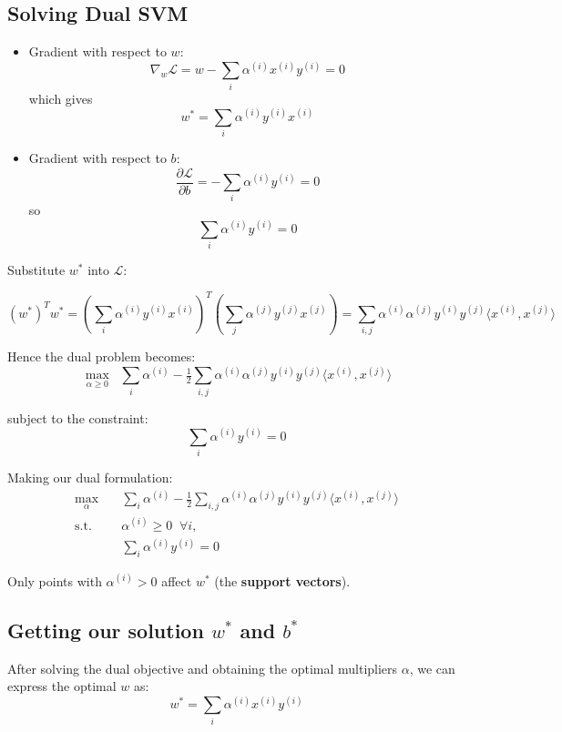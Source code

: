 \documentclass[11pt]{article}
\begin{document}
\subsection*{Solving Dual SVM}

\begin{itemize}
    \item Gradient with respect to $w$:
    \[
    \nabla_w \mathcal{L} = w - \sum_i \alpha^{(i)} x^{(i)} y^{(i)} = 0
    \]
    which gives
    \[
    w^* = \sum_i \alpha^{(i)} y^{(i)} x^{(i)}
    \]

    \item Gradient with respect to $b$:
    \[
    \frac{\partial \mathcal{L}}{\partial b} 
    = - \sum_i \alpha^{(i)} y^{(i)} = 0
    \]
    so
    \[
    \sum_i \alpha^{(i)} y^{(i)} = 0
    \]
\end{itemize}

Substitute $w^*$ into $\mathcal{L}$:

\[
(w^*)^T w^* = 
\left( \sum_i \alpha^{(i)} y^{(i)} x^{(i)} \right)^T
\left( \sum_j \alpha^{(j)} y^{(j)} x^{(j)} \right)
= \sum_{i,j} \alpha^{(i)} \alpha^{(j)} y^{(i)} y^{(j)} \langle x^{(i)}, x^{(j)} \rangle
\]

Hence the dual problem becomes:
\[
\max_{\alpha \geq 0} 
\;\; \sum_i \alpha^{(i)} 
- \tfrac{1}{2} \sum_{i,j} \alpha^{(i)} \alpha^{(j)} y^{(i)} y^{(j)} \langle x^{(i)}, x^{(j)} \rangle
\]

subject to the constraint:
\[
\sum_i \alpha^{(i)} y^{(i)} = 0
\]

Making our dual formulation:
\[
\begin{aligned}
\max_{\alpha} \quad & 
\sum_i \alpha^{(i)} 
- \tfrac{1}{2} \sum_{i,j} \alpha^{(i)} \alpha^{(j)} y^{(i)} y^{(j)} \langle x^{(i)}, x^{(j)} \rangle \\
\text{s.t.} \quad & \alpha^{(i)} \geq 0 \;\; \forall i, \\
& \sum_i \alpha^{(i)} y^{(i)} = 0
\end{aligned}
\]


Only points with $\alpha^{(i)} > 0$ affect $w^*$ (the \textbf{support vectors}).


\subsection*{Getting our solution $w^*$ and $b^*$}

After solving the dual objective and obtaining the optimal multipliers $\alpha$, we can express the optimal $w$ as:
\[
w^* = \sum_i \alpha^{(i)} x^{(i)} y^{(i)}
\]
\end{document}
